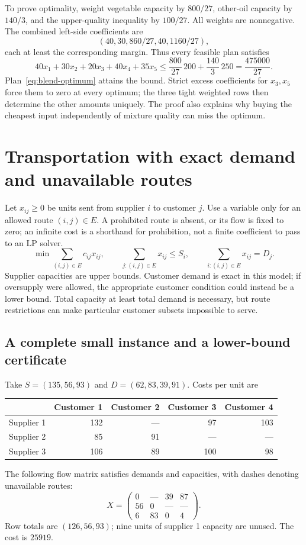\documentclass[11pt,a4paper]{article}
\begin{document}
To prove optimality, weight vegetable capacity by $800/27$, other-oil capacity
by $140/3$, and the upper-quality inequality by $100/27$. All weights are
nonnegative. The combined left-side coefficients are
\[
  (40,30,860/27,40,1160/27),
\]
each at least the corresponding margin. Thus every feasible plan satisfies
\[
  40x_1+30x_2+20x_3+40x_4+35x_5
  \leq\frac{800}{27}\,200+\frac{140}{3}\,250=\frac{475000}{27}.
\]
Plan~\eqref{eq:blend-optimum} attains the bound. Strict excess coefficients for
$x_3,x_5$ force them to zero at every optimum; the three tight weighted rows
then determine the other amounts uniquely. The proof also explains why buying
the cheapest input independently of mixture quality can miss the optimum.

\section{Transportation with exact demand and unavailable routes}\label{sec:transport}
Let $x_{ij}\geq0$ be units sent from supplier $i$ to customer $j$. Use a variable
only for an allowed route $(i,j)\in E$. A prohibited route is absent, or its flow
is fixed to zero; an infinite cost is a shorthand for prohibition, not a finite
coefficient to pass to an LP solver.
\[
  \min\sum_{(i,j)\in E}c_{ij}x_{ij},\qquad
  \sum_{j:(i,j)\in E}x_{ij}\leq S_i,\qquad
  \sum_{i:(i,j)\in E}x_{ij}=D_j.
\]
Supplier capacities are upper bounds. Customer demand is exact in this model;
if oversupply were allowed, the appropriate customer condition could instead
be a lower bound. Total capacity at least total demand is necessary, but route
restrictions can make particular customer subsets impossible to serve.

\subsection{A complete small instance and a lower-bound certificate}
Take $S=(135,56,93)$ and $D=(62,83,39,91)$. Costs per unit are
\begin{center}
  \begin{tabular}{lrrrr}\toprule
    & Customer 1 & Customer 2 & Customer 3 & Customer 4\\\midrule
    Supplier 1 & 132 & --- & 97 & 103\\
    Supplier 2 & 85 & 91 & --- & ---\\
    Supplier 3 & 106 & 89 & 100 & 98\\\bottomrule
  \end{tabular}
\end{center}
The following flow matrix satisfies demands and capacities, with dashes denoting
unavailable routes:
\[
  X=\begin{pmatrix}0&\text{---}&39&87\\56&0&\text{---}&\text{---}\\6&83&0&4\end{pmatrix}.
\]
Row totals are $(126,56,93)$; nine units of supplier 1 capacity are unused.
The cost is $25919$.
\end{document}
